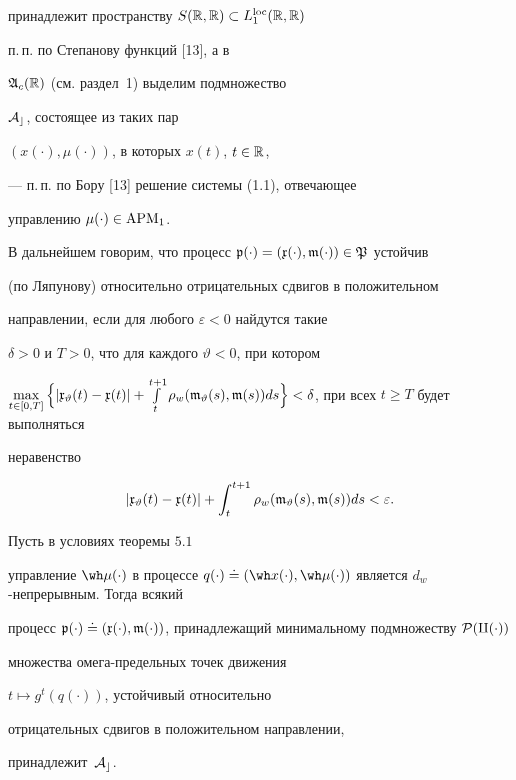 принадлежит пространству $S(\Bbb R,\Bbb R)


\subset L_1^{\loc}(\Bbb R,\Bbb R)$


п.\,п. по Степанову функций [13], а в


$\frak A_c(\Bbb R)$ (см. раздел~1) выделим подмножество


$\cal A_c$, состоящее из таких пар


$(x(\cdot),\mu(\cdot))$, в которых $x(t)$, $t\in\Bbb R$,


--- п.\,п. по Бору [13] решение системы (1.1), отвечающее


управлению $\mu(\cdot)\in\operatorname{APM}_1$.





В дальнейшем говорим, что процесс $\frak p(\cdot)=


(\frak x(\cdot),\frak m(\cdot))\in\frak P$ устойчив


(по Ляпунову) относительно отрицательных сдвигов в положительном


направлении, если для любого $\varepsilon<0$ найдутся такие


$\delta>0$ и $T>0$, что для каждого $\vartheta<0$, при котором


$\max\limits_{t\in[0,T]}\Big\{|\frak x_\vartheta(t)-\frak


x(t)|+\int\limits_t^{t+1}\rho_w({\frak m}_{\vartheta}(s),\frak


m(s))ds\Big\}<\delta$, при всех $t\ge T$ будет выполняться


неравенство


$$


|\frak x_\vartheta(t)-\frak x(t)|


+\int_t^{t+1}\rho_w({\frak m}_{\vartheta}(s),{\frak m}(s))ds


<\varepsilon.


$$








\begin{thms}


Пусть в условиях теоремы $5.1$


управление $\wh\mu(\cdot)$ в процессе $q(\cdot)\doteq(\wh


x(\cdot),\wh\mu(\cdot))$ является $d_{w}$-непрерывным. Тогда всякий


процесс $\frak p(\cdot)\doteq(\frak x(\cdot),


\frak m(\cdot))$, принадлежащий минимальному подмножеству $\cal P(q(\cdot))$


множества омега-предельных точек движения


$t\mapsto g^t(q(\cdot))$, устойчивый относительно


отрицательных сдвигов в положительном направлении,


принадлежит~$\cal A_c$.


\end{thms}








